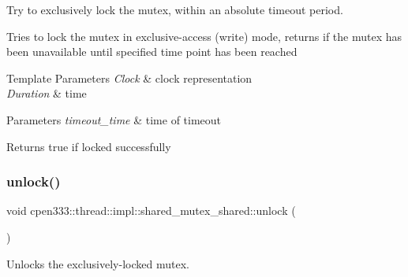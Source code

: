Try to exclusively lock the mutex, within an absolute timeout period. 

Tries to lock the mutex in exclusive-\/access (write) mode, returns if the mutex has been unavailable until specified time point has been reached


\begin{DoxyTemplParams}{Template Parameters}
{\em Clock} & clock representation \\
\hline
{\em Duration} & time \\
\hline
\end{DoxyTemplParams}

\begin{DoxyParams}{Parameters}
{\em timeout\+\_\+time} & time of timeout \\
\hline
\end{DoxyParams}
\begin{DoxyReturn}{Returns}
true if locked successfully 
\end{DoxyReturn}
\mbox{\label{classcpen333_1_1thread_1_1impl_1_1shared__mutex__shared_aa7e6c6ac6bbd3b72ada12d9f178c0cdd}} 
\subsubsection{\texorpdfstring{unlock()}{unlock()}}
{\footnotesize\ttfamily void cpen333\+::thread\+::impl\+::shared\+\_\+mutex\+\_\+shared\+::unlock (\begin{DoxyParamCaption}{ }\end{DoxyParamCaption})\hspace{0.3cm}{\ttfamily [inline]}}



Unlocks the exclusively-\/locked mutex. 

\mbox{\label{classcpen333_1_1thread_1_1impl_1_1shared__mutex__shared_afba02f4b80ffa817aaa124fa4418465d}} 
